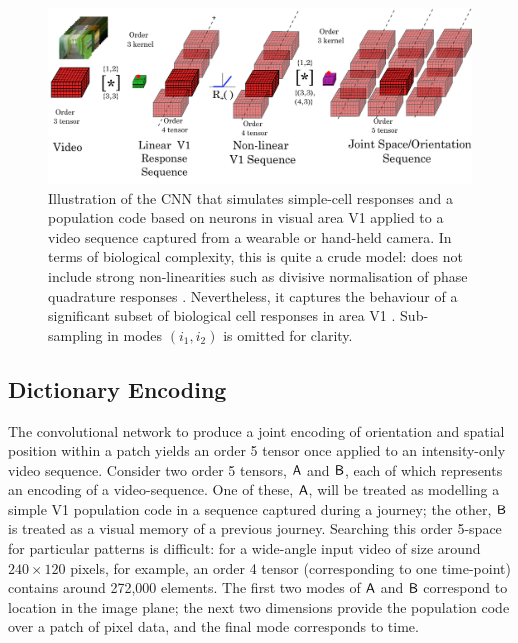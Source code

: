 \begin{figure}
\begin{center}
\includegraphics[width=\linewidth]{gfx/Chapter05/VideoEncoding.pdf}
\caption{Illustration of the CNN that simulates simple-cell responses and a population code based on neurons in visual area V1 applied to a video sequence captured from a wearable or hand-held camera.  In terms of biological complexity, this is quite a crude model: does not include strong non-linearities such as divisive normalisation of phase quadrature
responses \cite{petrou2008next}. Nevertheless, it captures the behaviour of a significant subset of biological cell responses in area V1 \cite{carandini1997predictions}. Sub-sampling in modes $(i_1,i_2)$ is omitted for clarity.}
\label{fig:arch}
\end{center}
\end{figure}

\subsection{Dictionary Encoding}
The convolutional network to produce a joint encoding of orientation and spatial position within a patch yields an order 5 tensor once applied to an intensity-only video sequence.  Consider two order 5 tensors, $\mathsf{A}$ and $\mathsf{B}$, each of which represents an encoding of a video-sequence.  One of these, $\mathsf{A}$, will be treated as modelling a simple V1 population code in a sequence captured during a journey; the other, $\mathsf{B}$ is treated as a visual memory of a previous journey.  Searching this order 5-space for particular patterns is difficult: for a wide-angle input video of size around $240\times120$ pixels, for example, an order 4 tensor (corresponding to one time-point) contains around 272,000 elements.  The first two modes of $\mathsf{A}$ and $\mathsf{B}$ correspond to location in the image plane; the next two dimensions provide the population code over a patch of pixel data, and the final mode corresponds to time.  \\


